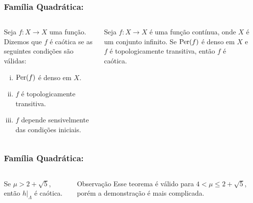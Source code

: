 
\begin{frame}
\vspace{5pt}
\frametitle{Família Quadrática: \subsecname}
\begin{columns}
\column{\dimexpr\paperwidth-15pt}

\begin{definition}
Seja $f: X \to X$ uma função. Dizemos que $f$ é caótica se as seguintes condições são válidas:
\begin{enumerate}[i.]
\item $\operatorname{Per}(f)$ é denso em $X$.
\item $f$ é topologicamente transitiva.
\item $f$ depende sensivelmente das condições iniciais.
\end{enumerate}
\end{definition}

\vspace{10pt}

\begin{theorem}
Seja $f: X \to X$ é uma função contínua, onde $X$ é um conjunto infinito. Se $\operatorname{Per}(f)$ é denso em $X$ e $f$ é topologicamente transitiva, então $f$ é caótica.
\end{theorem}

\end{columns}
\end{frame}


\begin{frame}
\vspace{5pt}
\frametitle{Família Quadrática: \subsecname}
\begin{columns}
\column{\dimexpr\paperwidth-15pt}

\begin{theorem}
Se $\mu > 2 + \sqrt{5}$, então $h|_\Lambda$ é caótica.
\end{theorem}

\begin{block}{Observação}
Esse teorema é válido para $4 < \mu \leq 2 + \sqrt{5}$, porém a demonstração é mais complicada.
\end{block}

\end{columns}
\end{frame}
